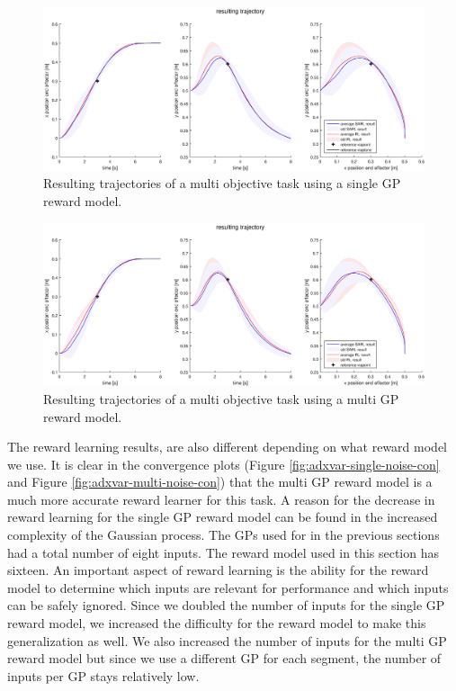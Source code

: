 \documentclass[mscThesis.tex]{subfiles}
\begin{document}


\begin{figure}[!htb]
    \centering
    \includegraphics[width=\textwidth, height = 6 cm]{figures/results/advancedx-var/trajectory_single_noise_sum.eps}
    \caption{Resulting trajectories of a multi objective task using a single GP reward model.}
    \label{fig:adxvar-single-noise-traject}
\end{figure}
    
\begin{figure}
    \centering
    \includegraphics[width=\textwidth, height = 6 cm]{figures/results/advancedx-var/trajectory_multi_noise_sum.eps}
    \caption{Resulting trajectories of a multi objective task using a multi GP reward model.}
    \label{fig:adxvar-multi-noise-traject}
\end{figure}

The reward learning results, are also different depending on what reward model we use. It is clear in the convergence plots (Figure \ref{fig:adxvar-single-noise-con} and Figure \ref{fig:adxvar-multi-noise-con}) that the multi GP reward model is a much more accurate reward learner for this task. A reason for the decrease in reward learning for the single GP reward model can be found in the increased complexity of the Gaussian process. The GPs used for in the previous sections had a total number of eight inputs. The reward model used in this section has sixteen. An important aspect of reward learning is the ability for the reward model to determine which inputs are relevant for performance and which inputs can be safely ignored. Since we doubled the number of inputs for the single GP reward model, we increased the difficulty for the reward model to make this generalization as well. We also increased the number of inputs for the multi GP reward model but since we use a different GP for each segment, the number of inputs per GP stays relatively low. 
\end{document}
